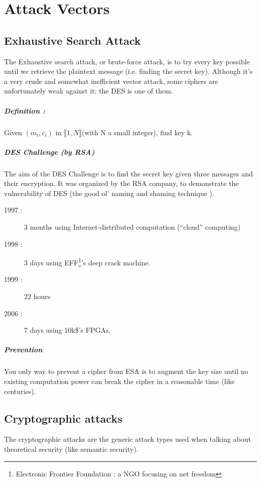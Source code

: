 \chapter{Attack Vectors}


\section{Exhaustive Search Attack}
    The Exhaustive search attack, or brute-force attack, is to try every key possible until we retrieve the plaintext message (i.e. finding the secret key). Although it's a very crude and somewhat inefficient vector attack, some ciphers are unfortunately weak against it: the DES is one of them.
    
\paragraph{Definition :}
Given $(m_i,c_i)$ in $\llbracket 1,N \rrbracket$(with N a small integer), find key k.

\paragraph{DES Challenge (by RSA)\\}
The aim of the DES Challenge is to find the secret key given three messages and their encryption. It was organized by the RSA company, to demonstrate the vulnerability of DES (the good ol' naming and shaming technique ).

\begin{description}
\item[1997 : ] 3 months using Internet-distributed computation (``cloud'' computing)
\item[1998 : ] 3 days using EFF\footnote{Electronic Frontier Foundation : a NGO focusing on net freedom}'s deep crack machine.
\item[1999 : ] 22 hours
\item[2006 : ] 7 days using 10k\$'s FPGAs.
\end{description}

\paragraph{Prevention}
You only way to prevent a cipher from ESA is to augment the key size until no existing computation power can break the cipher in a reasonable time (like centuries).

\section{Cryptographic attacks}
The cryptographic attacks are the generic attack types used when talking about theoretical security (like semantic security).

